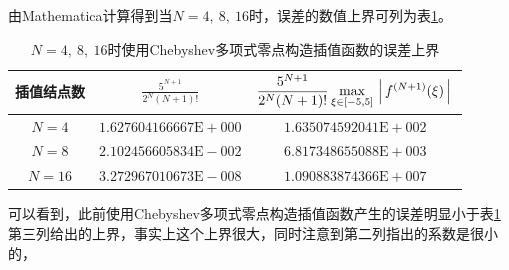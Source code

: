 \documentclass[11pt]{article}
\begin{document}
由Mathematica计算得到当$N = 4,\ 8,\ 16$时，误差的数值上界可列为表\ref{table2}。
\begin{table}[h]
    \centering
    \begin{tabular}{|c|c|c|}
        \hline
        插值结点数 & $\displaystyle \frac{5^{N + 1}}{2^N(N + 1)!}$ & $\displaystyle \frac{5^{N + 1}}{2^N(N + 1)!} \max_{\xi \in [-5, 5]}{\left \arrowvert f^{(N + 1)}(\xi) \right \arrowvert} $ \\ \hline
        $N = 4$    & $1.627604166667\text{E}{+}000$                & $1.635074592041\text{E}{+}002$                                                                                             \\ \hline
        $N = 8$    & $2.102456605834\text{E}{-}002$                & $6.817348655088\text{E}{+}003$                                                                                             \\ \hline
        $N = 16$   & $3.272967010673\text{E}{-}008$                & $1.090883874366\text{E}{+}007$                                                                                             \\ \hline
    \end{tabular}
    \caption{$N = 4,\ 8,\ 16$时使用Chebyshev多项式零点构造插值函数的误差上界}
    \label{table2}
\end{table}
可以看到，此前使用Chebyshev多项式零点构造插值函数产生的误差明显小于表\ref{table2}第三列给出的上界，事实上这个上界很大，同时注意到第二列指出的系数是很小的，
\end{document}
